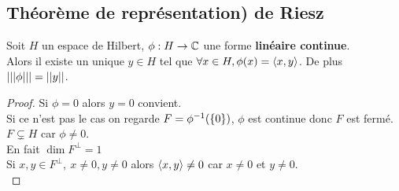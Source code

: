 \subsection{Théorème de représentation) de Riesz}

\begin{theorem}
	Soit $H$ un espace de Hilbert, $\phi : H \to \mathbb{C}$ une forme \textbf{linéaire continue}.\\
	Alors il existe un unique $y \in H$ tel que $\forall x \in H, \phi(x) = \left\langle x, y \right\rangle$.
	De plus $\left|\left|\left|\phi\right|\right|\right| = \left|\left|y\right|\right|$.
\end{theorem}


\begin{proof}
	Si $\phi = 0$ alors $y = 0$ convient.\\
	Si ce n'est pas le cas on regarde $F = \phi^{-1}(\left\{0\right\})$, $\phi$ est continue donc $F$ est fermé.\\
	$F \subsetneq H$ car $\phi \neq 0$.\\
	En fait $\dim F^\perp = 1$\\
	Si $x,y \in F^\perp,\ x \neq 0, y \neq 0$ alors $\left\langle x, y \right\rangle \neq 0$ car $x \neq 0$ et $y \neq 0$.\\
\end{proof}


